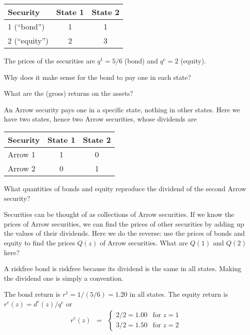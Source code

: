 \documentclass[11pt]{exam}
\begin{document}
\begin{questions}
\medskip
\begin{center}
\begin{tabular}{lcc}
\toprule
Security  &  State 1 & State 2 \\
\midrule
1 (``bond'')    &  1    &   1  \\
2 (``equity'')  &  2    &   3  \\
\bottomrule
\end{tabular}
\end{center}

\medskip
The prices of the securities are $q^1 = 5/6$ (bond) and $q^e = 2$ (equity).

\begin{parts}
\item Why does it make sense for the bond to pay one in each state?
\item What are the (gross) returns on the assets?
\item An Arrow security pays one in a specific state, nothing in other states.
Here we have two states, hence two Arrow securities, whose dividends are

\bigskip
\begin{center}
\begin{tabular}{lcc}
\toprule
Security  &  State 1 & State 2 \\
\midrule
Arrow 1     &  1    &   0  \\
Arrow 2     &  0    &   1  \\
\bottomrule
\end{tabular}
\end{center}

\medskip
What quantities of bonds and equity reproduce the dividend of the second Arrow
security?

\item Securities can be thought of as collections of Arrow securities.
If we know the prices of Arrow securities, we can find the prices
of other securities by adding up the values of their dividends.
Here we do the reverse:  use the prices of bonds and equity to
find the prices $Q(z)$ of Arrow securities.
What are $Q(1)$ and $Q(2)$ here?
\end{parts}

\begin{solution}
\begin{parts}
\item A riskfree bond is riskfree because its dividend is the same
in all states.
Making the dividend one is simply a convention.

\item The bond return is $ r^1 = 1/(5/6) = 1.20 $ in all states.
The equity return is $r^e(z) = d^e(z)/q^e $ or
\begin{eqnarray*}
    r^e(z) &=&
        \left\{
        \begin{array}{ll}
        2/2 = 1.00 &  \mbox{for } z=1 \\
        3/2 = 1.50 &  \mbox{for } z=2
        \end{array}
        \right.
\end{eqnarray*}


\end{parts}
\end{solution}
\end{questions}
\end{document}
